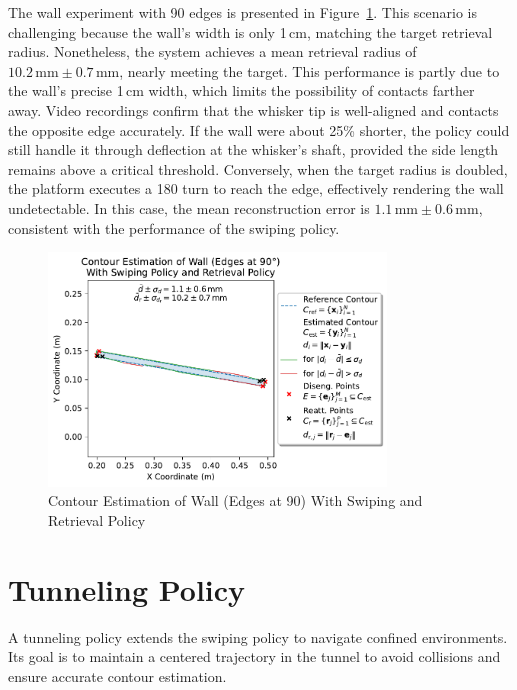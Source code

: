 The wall experiment with 90\degree{} edges is presented in Figure~\ref{fig:experiment-wall-edges-90deg-swiping-retrieval}.
This scenario is challenging because the wall’s width is only 1\,cm, matching the target retrieval radius.
Nonetheless, the system achieves a mean retrieval radius of $10.2\,\text{mm} \pm 0.7\,\text{mm}$, nearly meeting the target.
This performance is partly due to the wall’s precise 1\,cm width, which limits the possibility of contacts farther away.
Video recordings confirm that the whisker tip is well-aligned and contacts the opposite edge accurately.
If the wall were about 25\% shorter, the policy could still handle it through deflection at the whisker’s shaft, provided the side length remains above a critical threshold.
Conversely, when the target radius is doubled, the platform executes a 180\degree{} turn to reach the edge, effectively rendering the wall undetectable.
In this case, the mean reconstruction error is $1.1\,\text{mm} \pm 0.6\,\text{mm}$, consistent with the performance of the swiping policy.

\begin{figure}[!htb]
    \centering
    \includegraphics[width=0.8\textwidth]{figures/experiments/wall-edges-90deg-swiping-retrieval}
    \caption{Contour Estimation of Wall (Edges at 90\degree{}) With Swiping and Retrieval Policy}
    \label{fig:experiment-wall-edges-90deg-swiping-retrieval}
\end{figure}


\section{Tunneling Policy}
A tunneling policy extends the swiping policy to navigate confined environments.
Its goal is to maintain a centered trajectory in the tunnel to avoid collisions and ensure accurate contour estimation.

